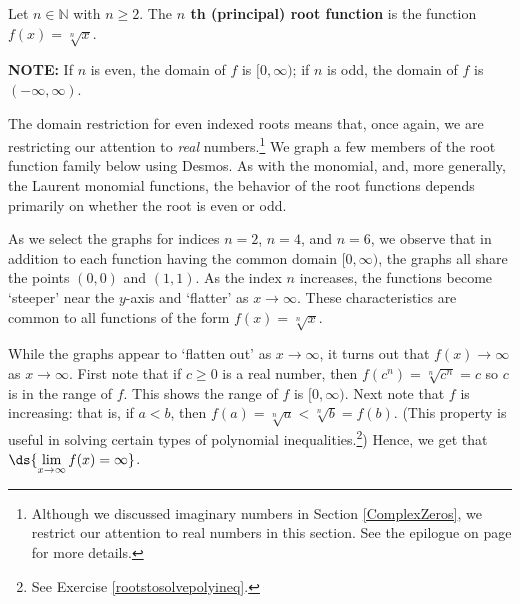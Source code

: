 \documentclass{ximera}
\begin{document}
\smallskip


\begin{definition} \label{principalrootfunction}  Let $n \in \mathbb{N}$ with $n \geq 2$.  The  \textbf{$n$ th (principal) root function} is the function $f(x) = \sqrt[n]{x}$.  

\textbf{NOTE:}  If $n$ is even, the domain of $f$ is $[0, \infty)$;  if $n$ is odd, the domain of $f$ is $(-\infty, \infty)$.

\end{definition}


\smallskip

The domain restriction for even indexed roots means that, once again, we are restricting our attention to \textit{real} numbers.\footnote{Although we discussed imaginary numbers in Section \ref{ComplexZeros}, we restrict our attention to real numbers in this section.  See the epilogue on page \pageref{complexepilogue} for more details.}  We graph a few members of the root function family below using Desmos.   As with the monomial, and, more generally, the Laurent monomial functions, the behavior of the root functions depends primarily on whether the root is even or odd.  

As we select the graphs for indices $n = 2$, $n=4$, and $n=6$, we observe that in addition to each function having the common domain $[0, \infty)$, the graphs  all share the points $(0,0)$ and $(1,1)$. As the index $n$ increases, the functions become `steeper' near the $y$-axis and `flatter' as $x \rightarrow \infty$.  These characteristics are common to all functions of the form $f(x) = \sqrt[n]{x}$.

While the graphs appear to `flatten out' as $x \rightarrow \infty$, it turns out that $f(x) \rightarrow \infty$ as $x \rightarrow \infty$. First note that if $c \geq 0$ is a real number, then $f(c^n) = \sqrt[n]{c^n} = c$ so $c$ is in the range of $f$.  This shows the range of $f$ is $[0, \infty)$.  Next note that $f$ is increasing:  that is, if $a<b$, then $f(a) = \sqrt[n]{a} < \sqrt[n]{b} = f(b)$. (This property is useful in solving certain types of polynomial inequalities.\footnote{See Exercise \ref{rootstosolvepolyineq}.})  Hence, we get that $\ds{\lim_{x \rightarrow \infty} f(x) = \infty}$.

\end{document}
